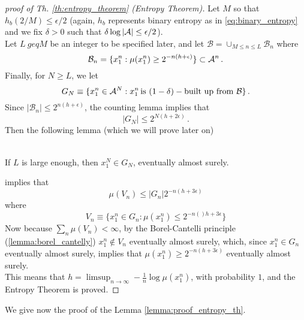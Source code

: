 \begin{proof} [proof of Th. \ref{th:entropy_theorem} (Entropy Theorem)]
    Let $M$ so that $h_b(2/M) \leq \epsilon/2$ (again, $h_b$ represents binary entropy as in \ref{eq:binary_entropy} and we fix $\delta>0$ such that $\delta \log |\mathcal{A}| \leq \epsilon/2$). 
    \\Let $L \ geq M$ be an integer to be specified later, and let $\mathcal{B}= \cup_{M \leq n \leq L} \mathcal{B}_n$ where
    \begin{equation*}
        \mathcal{B}_n = \{ x_1^n : \mu(x_1^n) \geq 2^{-n(h+\epsilon)}\} \subset \mathcal{A}^n \, .
    \end{equation*}
    Finally, for $N \geq L$, we let 
    \begin{equation*}
        G_N \equiv \{ x_1^n \in \mathcal{A}^N : x_1^n \, \text{is} \,\, (1-\delta)- \text{built up from $\mathcal{B}$}\} \, .
    \end{equation*}
    Since $|\mathcal{B}_n| \leq 2^{n(h+\epsilon)}$, the counting lemma implies that 
    \begin{equation*}
        |G_N| \leq 2^{N(h + 2\epsilon)} \, .
    \end{equation*}
    Then the following lemma (which we will prove later on)
    \begin{lemma}
    \label{lemma:proof_entropy_th}
        \hfill \\
        If $L$ is large enough, then $x_1^N \in G_N$, eventually almost surely.
    \end{lemma}
    implies that
    \begin{equation*}
        \mu(V_n) \leq |G_n| 2^{-n(h+3\epsilon)}
    \end{equation*}
    where 
    \begin{equation*}
        V_n \equiv \{ x_1^n \in G_n : \mu(x_1^n) \leq 2^{-n()h+3\epsilon} \}
    \end{equation*}
    Now because $\sum_n \mu(V_n) < \infty$, by the Borel-Cantelli principle (\ref{lemma:borel_cantelly}) $x_1^n \notin V_n$ eventually almost surely, which, since $x_1^n \in G_n$ eventually almost surely, implies that $\mu(x_1^n) \geq 2^{-n(h+3\epsilon)}$ eventually almost surely.
    \\This means that $h = \limsup_{n \rightarrow \infty} -\frac{1}{n} \log \mu(x_1^n)$, with probability $1$, and the Entropy Theorem is proved.
\end{proof}
We give now the proof of the Lemma \ref{lemma:proof_entropy_th}.
